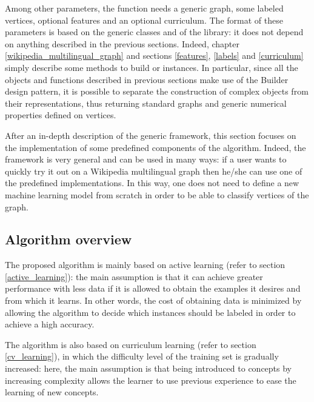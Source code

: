         Among other parameters, the function needs a generic graph, some labeled vertices, optional features and an optional curriculum. The format of these parameters is based on the generic classes  and  of the  library: it does not depend on anything described in the previous sections. Indeed, chapter \ref{wikipedia_multilingual_graph} and sections \ref{features}, \ref{labels} and \ref{curriculum} simply describe some methods to build  or  instances. In particular, since all the objects and functions described in previous sections make use of the Builder design pattern, it is possible to separate the construction of complex objects from their representations, thus returning standard graphs and generic numerical properties defined on vertices.
        
        After an in-depth description of the generic framework, this section focuses on the implementation of some predefined components of the algorithm. Indeed, the framework is very general and can be used in many ways: if a user wants to quickly try it out on a Wikipedia multilingual graph then he/she can use one of the predefined implementations. In this way, one does not need to define a new machine learning model from scratch in order to be able to classify vertices of the graph.
        \subsection{Algorithm overview}\label{algorithm_overview}
            The proposed algorithm is mainly based on active learning (refer to section \ref{active_learning}): the main assumption is that it can achieve greater performance with less data if it is allowed to obtain the examples it desires and from which it learns. In other words, the cost of obtaining data is minimized by allowing the algorithm to decide which instances should be labeled in order to achieve a high accuracy.
            
            The algorithm is also based on curriculum learning (refer to section \ref{cv_learning}), in which the difficulty level of the training set is gradually increased: here, the main assumption is that being introduced to concepts by increasing complexity allows the learner to use previous experience to ease the learning of new concepts.
            
